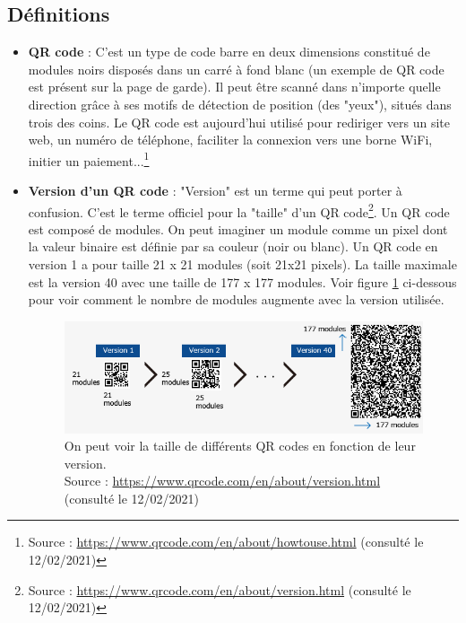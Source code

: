 \documentclass[a4paper,12pt]{article}
\begin{document}
\subsection{Définitions}
\begin{itemize}

    \item \textbf{QR code} : C'est un type de code barre en deux dimensions constitué de modules noirs disposés dans un carré à fond blanc (un exemple de QR code est présent sur la page de garde). Il peut être scanné dans n'importe quelle direction grâce à ses motifs de détection de position (des "yeux"), situés dans trois des coins. Le QR code est aujourd'hui utilisé pour rediriger vers un site web, un numéro de téléphone, faciliter la connexion vers une borne WiFi, initier un paiement...\footnote{Source : \url{https://www.qrcode.com/en/about/howtouse.html} (consulté le 12/02/2021)}\\
    
    \item \textbf{Version d'un QR code} : "Version" est un terme qui peut porter à confusion. C'est le terme officiel pour la "taille" d'un QR code\footnote{Source : \url{https://www.qrcode.com/en/about/version.html} (consulté le 12/02/2021)}. Un QR code est composé de modules. On peut imaginer un module comme un pixel dont la valeur binaire est définie par sa couleur (noir ou blanc). Un QR code en version 1 a pour taille 21 x 21 modules (soit 21x21 pixels). La taille maximale est la version 40 avec une taille de 177 x 177 modules. Voir figure \ref{fig:versionQR} ci-dessous pour voir comment le nombre de modules augmente avec la version utilisée.\\
    
    \begin{figure}[H]
        \begin{center}
            \includegraphics[width=.7\textwidth]{versionVarietyImage.png}
            \caption{On peut voir la taille de différents QR codes en fonction de leur version.\\Source : \url{https://www.qrcode.com/en/about/version.html} (consulté le 12/02/2021)}
            \label{fig:versionQR}
        \end{center}
    \end{figure}
    

\end{itemize}
\end{document}
